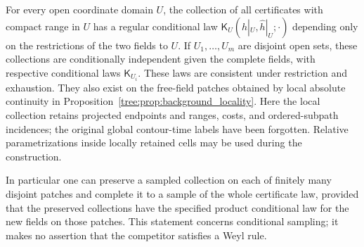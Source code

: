 \begin{proposition}\label{tree:prop:locality}
For every open coordinate domain $U$, the collection of all certificates
with compact range in $U$ has a regular conditional law
$\mathsf K_U(h|_U,\widehat h|_U;\cdot)$ depending only on the restrictions
of the two fields to $U$.  If $U_1,\ldots,U_m$ are disjoint open sets,
these collections are conditionally independent given the complete
fields, with respective conditional laws $\mathsf K_{U_i}$.
These laws are consistent under restriction and exhaustion.  They
also exist on the free-field patches obtained by local absolute
continuity in Proposition~\ref{tree:prop:background_locality}.
Here the local collection retains projected endpoints and ranges,
costs, and ordered-subpath incidences; the original global contour-time
labels have been forgotten.  Relative parametrizations inside locally
retained cells may be used during the construction.

In particular one can preserve a sampled collection on each of finitely
many disjoint patches and complete it to a sample of the whole
certificate law, provided that the preserved collections have the
specified product conditional law for the new fields on those patches.
This statement concerns conditional sampling; it makes no assertion
that the competitor satisfies a Weyl rule.
\end{proposition}

